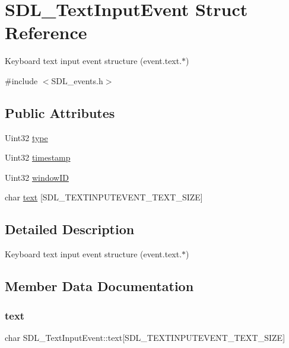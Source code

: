 \hypertarget{struct_s_d_l___text_input_event}{}\section{S\+D\+L\+\_\+\+Text\+Input\+Event Struct Reference}
\label{struct_s_d_l___text_input_event}


Keyboard text input event structure (event.\+text.$\ast$)  




{\ttfamily \#include $<$S\+D\+L\+\_\+events.\+h$>$}

\subsection*{Public Attributes}
\begin{DoxyCompactItemize}
\item 
Uint32 \mbox{\hyperlink{struct_s_d_l___text_input_event_a90576be2ea52e694deff40d0586654f5}{type}}
\item 
Uint32 \mbox{\hyperlink{struct_s_d_l___text_input_event_a20b190a96494918690ea7f99187be948}{timestamp}}
\item 
Uint32 \mbox{\hyperlink{struct_s_d_l___text_input_event_aeb4f7a939353990ca40261ffbfbeb3d0}{window\+ID}}
\item 
char \mbox{\hyperlink{struct_s_d_l___text_input_event_a1a95531f466dff01c2f108f53ff24554}{text}} \mbox{[}S\+D\+L\+\_\+\+T\+E\+X\+T\+I\+N\+P\+U\+T\+E\+V\+E\+N\+T\+\_\+\+T\+E\+X\+T\+\_\+\+S\+I\+ZE\mbox{]}
\end{DoxyCompactItemize}


\subsection{Detailed Description}
Keyboard text input event structure (event.\+text.$\ast$) 

\subsection{Member Data Documentation}
\mbox{\label{struct_s_d_l___text_input_event_a1a95531f466dff01c2f108f53ff24554}} 
\subsubsection{\texorpdfstring{text}{text}}
{\footnotesize\ttfamily char S\+D\+L\+\_\+\+Text\+Input\+Event\+::text\mbox{[}S\+D\+L\+\_\+\+T\+E\+X\+T\+I\+N\+P\+U\+T\+E\+V\+E\+N\+T\+\_\+\+T\+E\+X\+T\+\_\+\+S\+I\+ZE\mbox{]}}

